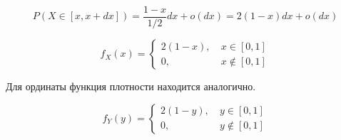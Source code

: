 \documentclass{article}
\begin{document}
{\[
    P(X\in [x, x+dx]) = \frac{1-x}{1/2}dx + o(dx)= 2(1-x)dx + o(dx)
\]

\[
        f_X(x) = \begin{cases}
        2(1-x),\ &x \in [0, 1]\\
        0,\ &x \notin [0, 1]
    \end{cases}
\]

Для ординаты функция плотности находится аналогично.

\[
        f_Y(y) = \begin{cases}
        2(1-y),\ &y \in [0, 1]\\
        0,\ &y \notin [0, 1]
    \end{cases}
\]
}

\end{document}
